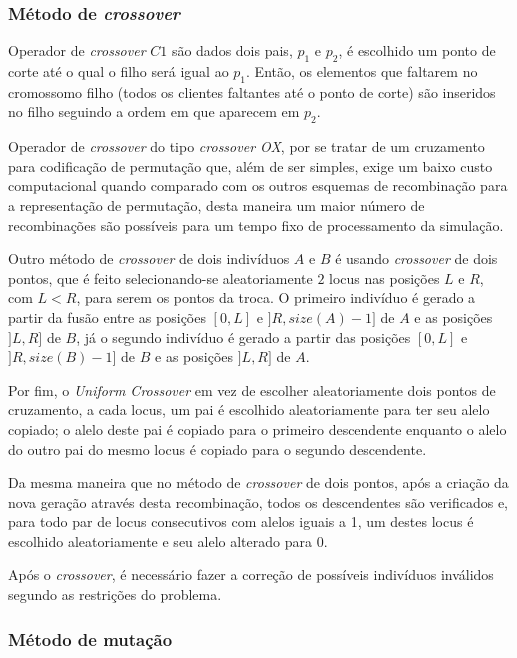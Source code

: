 \documentclass[conference]{IEEEtran}
\begin{document}
    \subsubsection{Método de \textit{crossover}}

        Operador de \textit{crossover} $C1$ são dados dois pais, $p_1$ e $p_2$, é escolhido um ponto de corte até o qual o filho será igual ao $p_1$. Então, os elementos que faltarem no
        cromossomo filho (todos os clientes faltantes até o ponto de corte) são inseridos no filho seguindo a ordem em que aparecem em $p_2$. 

        Operador de \textit{crossover} do tipo \emph{crossover OX}, por se tratar de um cruzamento para codificação de permutação que, além de ser simples, exige um baixo custo computacional
        quando comparado com os outros esquemas de recombinação para a representação de permutação, desta maneira um maior número de recombinações são possíveis para um tempo fixo de processamento
        da simulação. 

        Outro método de \textit{crossover} de dois indivíduos $A$ e $B$ é usando \textit{crossover} de dois pontos, que é feito selecionando-se aleatoriamente $2$ locus nas posições $L$ e $R$,
        com $L < R$, para serem os pontos da troca.  O primeiro indivíduo é gerado a partir da fusão entre as posições $[0, L]$ e $]R, size(A) - 1]$ de $A$ e as posições $]L, R]$ de $B$, já
        o segundo indivíduo é gerado a partir das posições $[0, L]$ e $]R, size(B) - 1]$ de $B$ e as posições $]L, R]$ de $A$.

        Por fim, o \textit{Uniform Crossover} em vez de escolher aleatoriamente dois pontos de cruzamento, a cada locus, um pai é escolhido aleatoriamente para ter seu alelo copiado; o alelo
        deste pai é copiado para o primeiro descendente enquanto o alelo do outro pai do mesmo locus é copiado para o segundo descendente.

        Da mesma maneira que no método de \textit{crossover} de dois pontos, após a criação da nova geração através desta recombinação, todos os descendentes são verificados e, para todo par de locus
        consecutivos com alelos iguais a 1, um destes locus é escolhido aleatoriamente e seu alelo alterado para 0.

        Após o \textit{crossover}, é necessário fazer a correção de possíveis indivíduos inválidos segundo as restrições do problema.

    \subsubsection{Método de mutação}
\end{document}
